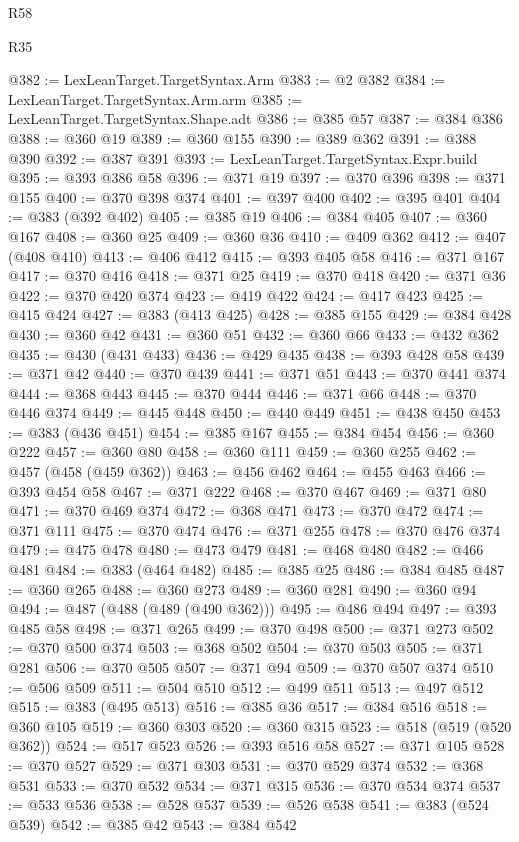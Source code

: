 \begin{lexlean}{R58}
\begin{lexlean}{R35}
\begin{coremodule}
{{{{{{{{{{{{{{{{{{{{{{{{{{{{{{{{{{{{{{{{{{{{{{{{{{{{@382 := LexLeanTarget.TargetSyntax.Arm
@383 := @2 @382
@384 := LexLeanTarget.TargetSyntax.Arm.arm
@385 := LexLeanTarget.TargetSyntax.Shape.adt
@386 := @385 @57
@387 := @384 @386
@388 := @360 @19
@389 := @360 @155
@390 := @389 @362
@391 := @388 @390
@392 := @387 @391
@393 := LexLeanTarget.TargetSyntax.Expr.build
@395 := @393 @386 @58
@396 := @371 @19
@397 := @370 @396
@398 := @371 @155
@400 := @370 @398 @374
@401 := @397 @400
@402 := @395 @401
@404 := @383 (@392 @402)
@405 := @385 @19
@406 := @384 @405
@407 := @360 @167
@408 := @360 @25
@409 := @360 @36
@410 := @409 @362
@412 := @407 (@408 @410)
@413 := @406 @412
@415 := @393 @405 @58
@416 := @371 @167
@417 := @370 @416
@418 := @371 @25
@419 := @370 @418
@420 := @371 @36
@422 := @370 @420 @374
@423 := @419 @422
@424 := @417 @423
@425 := @415 @424
@427 := @383 (@413 @425)
@428 := @385 @155
@429 := @384 @428
@430 := @360 @42
@431 := @360 @51
@432 := @360 @66
@433 := @432 @362
@435 := @430 (@431 @433)
@436 := @429 @435
@438 := @393 @428 @58
@439 := @371 @42
@440 := @370 @439
@441 := @371 @51
@443 := @370 @441 @374
@444 := @368 @443
@445 := @370 @444
@446 := @371 @66
@448 := @370 @446 @374
@449 := @445 @448
@450 := @440 @449
@451 := @438 @450
@453 := @383 (@436 @451)
@454 := @385 @167
@455 := @384 @454
@456 := @360 @222
@457 := @360 @80
@458 := @360 @111
@459 := @360 @255
@462 := @457 (@458 (@459 @362))
@463 := @456 @462
@464 := @455 @463
@466 := @393 @454 @58
@467 := @371 @222
@468 := @370 @467
@469 := @371 @80
@471 := @370 @469 @374
@472 := @368 @471
@473 := @370 @472
@474 := @371 @111
@475 := @370 @474
@476 := @371 @255
@478 := @370 @476 @374
@479 := @475 @478
@480 := @473 @479
@481 := @468 @480
@482 := @466 @481
@484 := @383 (@464 @482)
@485 := @385 @25
@486 := @384 @485
@487 := @360 @265
@488 := @360 @273
@489 := @360 @281
@490 := @360 @94
@494 := @487 (@488 (@489 (@490 @362)))
@495 := @486 @494
@497 := @393 @485 @58
@498 := @371 @265
@499 := @370 @498
@500 := @371 @273
@502 := @370 @500 @374
@503 := @368 @502
@504 := @370 @503
@505 := @371 @281
@506 := @370 @505
@507 := @371 @94
@509 := @370 @507 @374
@510 := @506 @509
@511 := @504 @510
@512 := @499 @511
@513 := @497 @512
@515 := @383 (@495 @513)
@516 := @385 @36
@517 := @384 @516
@518 := @360 @105
@519 := @360 @303
@520 := @360 @315
@523 := @518 (@519 (@520 @362))
@524 := @517 @523
@526 := @393 @516 @58
@527 := @371 @105
@528 := @370 @527
@529 := @371 @303
@531 := @370 @529 @374
@532 := @368 @531
@533 := @370 @532
@534 := @371 @315
@536 := @370 @534 @374
@537 := @533 @536
@538 := @528 @537
@539 := @526 @538
@541 := @383 (@524 @539)
@542 := @385 @42
@543 := @384 @542
}}}}}}}}}}}}}}}}}}}}}}}}}}}}}}}}}}}}}}}}}}}}}}}}}}}}
\end{coremodule}
\end{lexlean}
\end{lexlean}
